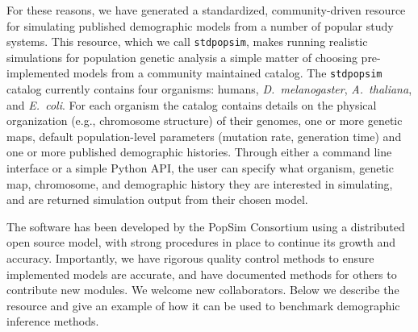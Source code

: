\documentclass[12pt,halfline,a4paper]{ouparticle}
\newcommand{\stdpopsim}{\texttt{stdpopsim}\xspace}
\begin{document}
For these reasons, we have generated a standardized, community-driven resource
for simulating published demographic models from a number of popular study systems.
This resource, which we call \texttt{stdpopsim}, makes running
realistic simulations for population genetic analysis a simple matter of
choosing pre-implemented models from a community maintained catalog.
The \stdpopsim catalog currently contains four organisms: humans,
\emph{D.~melanogaster}, \emph{A.~thaliana}, and \emph{E.~coli}. For each
organism the catalog contains details on the physical organization (e.g., chromosome structure)
of their genomes, one or more genetic maps, default population-level parameters (mutation rate,
generation time) and one or more published demographic histories. Through
either a command line interface or a simple Python API, the user can specify what
organism, genetic map, chromosome, and demographic history they are interested in simulating, and are returned
simulation output from their chosen model.

The software has been developed by the PopSim Consortium using a
distributed open source model, with strong procedures in place
to continue its growth and accuracy.
Importantly, we have rigorous quality control methods to ensure implemented models are accurate,
and have documented methods for others to contribute new modules.
We welcome new collaborators.
Below we describe the resource and give an
example of how it can be used to benchmark demographic inference methods.
\end{document}
